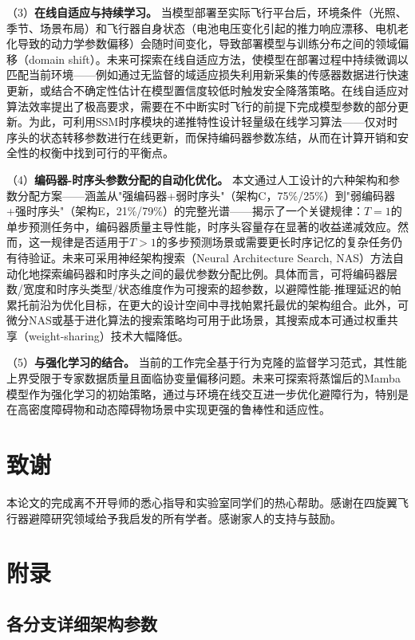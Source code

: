 \documentclass[12pt,a4paper]{article}
\makeatletter
\numberwithin{equation}{section}
\numberwithin{figure}{section}
\numberwithin{table}{section}
\newcommand{\cleardoublepage}{\clearpage\if@twoside\ifodd\c@page\else\hbox{}\thispagestyle{empty}\newpage\if@twocolumn\hbox{}\newpage\fi\fi\fi}%
\makeatother
\begin{document}
（3）\textbf{在线自适应与持续学习。} 当模型部署至实际飞行平台后，环境条件（光照、季节、场景布局）和飞行器自身状态（电池电压变化引起的推力响应漂移、电机老化导致的动力学参数偏移）会随时间变化，导致部署模型与训练分布之间的领域偏移（domain shift）。未来可探索在线自适应方法，使模型在部署过程中持续微调以匹配当前环境——例如通过无监督的域适应损失利用新采集的传感器数据进行快速更新，或结合不确定性估计在模型置信度较低时触发安全降落策略。在线自适应对算法效率提出了极高要求，需要在不中断实时飞行的前提下完成模型参数的部分更新。为此，可利用SSM时序模块的递推特性设计轻量级在线学习算法——仅对时序头的状态转移参数进行在线更新，而保持编码器参数冻结，从而在计算开销和安全性的权衡中找到可行的平衡点。

（4）\textbf{编码器-时序头参数分配的自动化优化。} 本文通过人工设计的六种架构和参数分配方案——涵盖从"强编码器+弱时序头"（架构C，75\%/25\%）到"弱编码器+强时序头"（架构E，21\%/79\%）的完整光谱——揭示了一个关键规律：$T=1$的单步预测任务中，编码器质量主导性能，时序头容量存在显著的收益递减效应。然而，这一规律是否适用于$T>1$的多步预测场景或需要更长时序记忆的复杂任务仍有待验证。未来可采用神经架构搜索（Neural Architecture Search, NAS）方法自动化地探索编码器和时序头之间的最优参数分配比例。具体而言，可将编码器层数/宽度和时序头类型/状态维度作为可搜索的超参数，以避障性能-推理延迟的帕累托前沿为优化目标，在更大的设计空间中寻找帕累托最优的架构组合。此外，可微分NAS或基于进化算法的搜索策略均可用于此场景，其搜索成本可通过权重共享（weight-sharing）技术大幅降低。

（5）\textbf{与强化学习的结合。} 当前的工作完全基于行为克隆的监督学习范式，其性能上界受限于专家数据质量且面临协变量偏移问题。未来可探索将蒸馏后的Mamba模型作为强化学习的初始策略，通过与环境在线交互进一步优化避障行为，特别是在高密度障碍物和动态障碍物场景中实现更强的鲁棒性和适应性。



\cleardoublepage
\section*{致谢}
本论文的完成离不开导师的悉心指导和实验室同学们的热心帮助。感谢在四旋翼飞行器避障研究领域给予我启发的所有学者。感谢家人的支持与鼓励。
\section{附录}

\subsection{各分支详细架构参数}
\label{app:arch_params}
\end{document}
